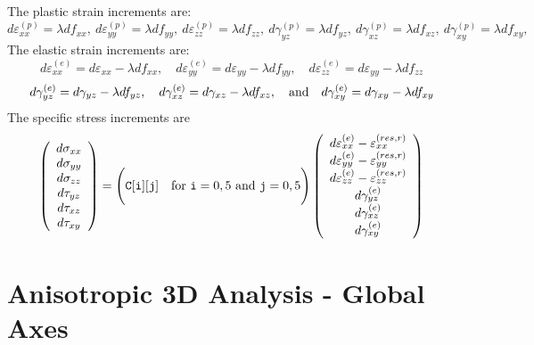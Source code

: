 \documentclass[11pt]{book}
\def\code#1{{\small\tt #1}}
\def\err#1{\varepsilon_{#1}^{(res,r)}}
\def\fvvec#1#2#3#4#5#6{\left(\begin{array}{ccc} #1 \\ #2 \\ #3 \\ #4 \\ #5 \\ #6 \end{array}\right)}
\def\g#1{\gamma_{#1}}
\def\s#1{\sigma_{#1}}
\def\t#1{\tau_{#1}}
\begin{document}
 The plastic strain increments are:
\begin{equation}
       d\varepsilon_{xx}^{(p)} = \lambda df_{xx}, \ 
       d\varepsilon_{yy}^{(p)} = \lambda df_{yy}, \ 
       d\varepsilon_{zz}^{(p)} = \lambda df_{zz}, \ 
       d\gamma_{yz}^{(p)} =  \lambda df_{yz}, \ 
       d\gamma_{xz}^{(p)} =  \lambda df_{xz}, \ 
       d\gamma_{xy}^{(p)} =  \lambda df_{xy},
\end{equation}
The elastic strain increments are:
\begin{equation}
       d\varepsilon_{xx}^{(e)} = d\varepsilon_{xx} -\lambda df_{xx}, \quad
       d\varepsilon_{yy}^{(e)} = d\varepsilon_{yy} -\lambda df_{yy}, \quad
       d\varepsilon_{zz}^{(e)} =  d\varepsilon_{yy} -\lambda df_{zz}
\end{equation}
\begin{equation}
       d\gamma_{yz}^{(e)} = d\gamma_{yz} -  \lambda df_{yz}, \quad 
       d\gamma_{xz}^{(e)} = d\gamma_{xz} -  \lambda df_{xz}, \quad  {\rm and} \quad
       d\gamma_{xy}^{(e)} = d\gamma_{xy} -  \lambda df_{xy}
\end{equation}
The specific stress increments are
\begin{equation}
      \fvvec{d\s{xx}}{d\s{yy}}{d\s{zz}}{d\t{yz}}{d\t{xz}}{d\t{xy}} = \Biggl(\code{C[i][j]} \quad {\rm for\ }\code{i}=0,5\ {\rm and\ }\code{j}=0,5\Biggr)
          \fvvec{d\varepsilon_{xx}^{(e)}  - \err{xx}}{d\varepsilon_{yy}^{(e)}  -\err{yy}}{d\varepsilon_{zz}^{(e)}  -\err{zz}}
                             {d\g{yz}^{(e)}}{d\g{xz}^{(e)}}{d\g{xy}^{(e)}}
 \end{equation}

\section{Anisotropic 3D Analysis - Global Axes}
\end{document}
